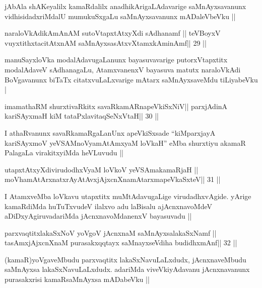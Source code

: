 \begin{artha}
jAbAla shAKeyalilx kamaRdalilx anadhikArigaLAdavarige saMnAyxsavanunx
vidhisidadxriMdalU mumukuSxgaLu saMnAyxsavanunx mADaleVbeVku ||
\end{artha}

\begin{shl}
naraloVkAdikAmAnAM sutoVtapxtAtxyXdi sAdhanamf ||
teVBoyxV vuyxtithxtacitAtxnAM saMnAyxsasAtxvXtamxkAminAmf\hfill || 29 ||
\end{shl}

\begin{artha}
manuSayxloVka modalAdavugaLanunx bayasuvavarige putorxVtapxtitx
modalAdaveV sAdhanagaLu, AtamxvanenxV bayasuva matutx naraloVkAdi
BoVgavanunx biTaTx citatxvuLaLxvarige mAtarx saMnAyxsaveMdu
tiLiyabeVku |
\end{artha}

\begin{shl}
imamathaRM shurxtivaRkitx savaRkamARnapeVkiSxNiV||
parxjAdinA kariSAyxmaH kiM tataPxlavitaqSeNxVtaH\hfill || 30 ||
\end{shl}

\begin{artha}
I athaRvanunx savaRkamaRgaLanUnx apeVkiSxsade ``kiMparxjayA
kariSAyxmoV yeVSAMnoV\s yamAtAmxyaM loVkaH'' eMba shurxtiyu akamaR
PalagaLa virakitxyiMda  heVLuvudu ||
\end{artha}


\begin{shl}
utapxtAtxyXdivirudodhxV\s yaM loVkoV yeVSAmakamaRjaH ||
moVhamAtArxnatxrAyAtAvxjAjxcnXnamAtarxmapeVkaSxteV\hfill || 31 ||
\end{shl}

\begin{artha}
I AtamxveMba loVkavu utapxtitx muMtAdavugaLige virudadhxvAgide. yArige
kamaRdiMda huTuTxvudeV ilalxvo adu laBisalu ajAcnxnavoMdeV
aDiDxyAgiruvadariMda jAcnxnavoMdanenxV bayasuvadu ||
\end{artha}


\begin{shl}
parxvaqtitxlakaSxNoV yoVgoV jAcnxnaM saMnAyxsalakaSxNamf ||
tasAmxjAjxcnXnaM purasakxqqtayx saMnayxseVdiha budidhxmAnf\hfill || 32 ||
\end{shl}

\begin{artha}
(kamaR)yoVgaveMbudu parxvaqtitx lakaSxNavuLaLxdudx, jAcnxnaveMbudu
  saMnAyxsa lakaSxNavuLaLxdudx. adariMda viveVkiyAdavanu jAcnxnavanunx
  purasakxrisi kamaRsaMnAyxsa mADabeVku || 
\end{artha}

